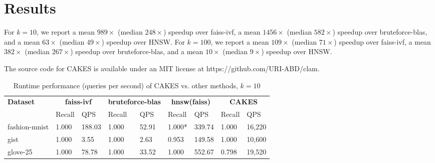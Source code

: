 \section{Results}
\label{sec:results}

For $k= 10$, we report a mean $989\times$ (median $248\times$) speedup over faiss-ivf, a mean $1456\times$ (median $582\times$) speedup over bruteforce-blas, 
and a mean $63\times$ (median $49\times$) speedup over HNSW. For $k=100$, we report a mean $109\times$ (median $71\times$) speedup over faiss-ivf, a mean $382\times$ (median $267\times$) speedup over bruteforce-blas, and a mean $10\times$ (median $9\times$) speedup over HNSW.


The source code for CAKES is available under an MIT
license at https://github.com/URI-ABD/clam.

\begin{table*}[!t]
    \caption{Runtime performance (queries per second) of CAKES vs. other methods, $k=10$}
    \label{table:results:ann-10}
    \vskip 0.15in
    \begin{center}
    \begin{small}
    \begin{sc}
    \begin{tabular}{|l|p{1cm}|p{1cm}|p{1cm}|p{1cm}|p{1cm}|p{1cm}|p{1cm}|p{1cm}|}
    \textbf{Dataset}  & \multicolumn{2}{|c|}{\textbf{faiss-ivf}} & \multicolumn{2}{|c|}{\textbf{bruteforce-blas}} & \multicolumn{2}{|c|}{\textbf{hnsw(faiss)}} & \multicolumn{2}{|c|}{\textbf{CAKES}} \\
    \cline{2-9}
    &                    Recall & QPS                           & Recall & QPS                           & Recall & QPS                                           & Recall & QPS \\
    \hline
    fashion-mnist      & 1.000 & 188.03                           & 1.000 & 52.91                                  & 1.000* & 339.74                                                    & 1.000 & 16,220 \\
    \hline
    gist                   & 1.000 & 3.55                           & 1.000 & 2.63                                     & 0.953 & 149.58                                                   & 1.000 & 10,600 \\
    \hline
    glove-25              & 1.000 & 78.78                          & 1.000 & 33.52                              & 1.000 & 552.67                                                  & 0.798 & 19,520 \\

\end{tabular}
\end{sc}
\end{small}
\end{center}
\end{table*}
